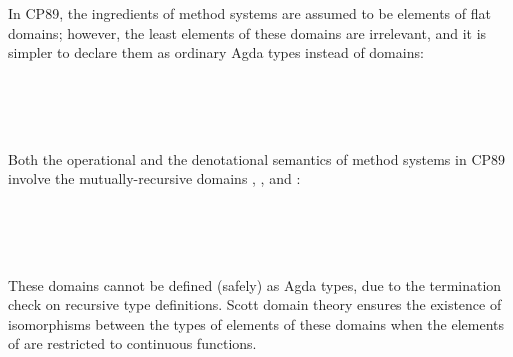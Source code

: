 \begin{AgdaAlign}
In CP89, the ingredients of method systems are assumed to be elements of flat domains;
however, the least elements of these domains are irrelevant,
and it is simpler to declare them as ordinary Agda types instead of domains:
%
\begin{code}%
%
\>[4]\AgdaSymbol{(}\AgdaSpace{}%
%
\>[17]\AgdaSymbol{:}\AgdaSpace{}%
\AgdaSpace{}%
\AgdaSymbol{)}%
\>[32]\<%
\\
%
\>[4]\AgdaSymbol{(}\AgdaSpace{}%
%
\>[17]\AgdaSymbol{:}\AgdaSpace{}%
\AgdaSpace{}%
\AgdaSymbol{)}%
\>[32]\<%
\\
%
\>[4]\AgdaSymbol{(}\AgdaSpace{}%
%
\>[17]\AgdaSymbol{:}\AgdaSpace{}%
\AgdaSpace{}%
\AgdaSymbol{)}%
\>[32]\<%
\\
%
\>[4]\AgdaSymbol{(}\AgdaSpace{}%
%
\>[17]\AgdaSymbol{:}\AgdaSpace{}%
\AgdaSpace{}%
\AgdaSymbol{)}%
\>[32]\<%
\end{code}
%
Both the operational and the denotational semantics of method systems in CP89 involve
the mutually-recursive domains , , and :
%
\begin{code}%
%
\>[4]\AgdaSymbol{(}\AgdaSpace{}%
%
\>[16]\AgdaSymbol{:}\AgdaSpace{}%
\AgdaSpace{}%
\AgdaSymbol{)}%
\>[32]\<%
\\
%
\>[4]\AgdaSymbol{(}\AgdaSpace{}%
%
\>[16]\AgdaSymbol{:}\AgdaSpace{}%
\AgdaSpace{}%
\AgdaSymbol{)}%
\>[32]\<%
\\
%
\>[4]\AgdaSymbol{(}\AgdaSpace{}%
%
\>[16]\AgdaSymbol{:}\AgdaSpace{}%
\AgdaSpace{}%
\AgdaSymbol{)}%
\>[32]\<%
\\
%
\>[4]\AgdaSymbol{(}\AgdaSpace{}%
%
\>[16]\AgdaSymbol{:}\AgdaSpace{}%
\AgdaSpace{}%
\AgdaSymbol{)}%
\>[32]\<%
\end{code}
%
These domains cannot be defined (safely) as Agda types,
due to the termination check on recursive type definitions.
Scott domain theory ensures the existence of isomorphisms between the types of elements of these domains
when the elements of  are restricted to continuous functions.

\end{AgdaAlign}
